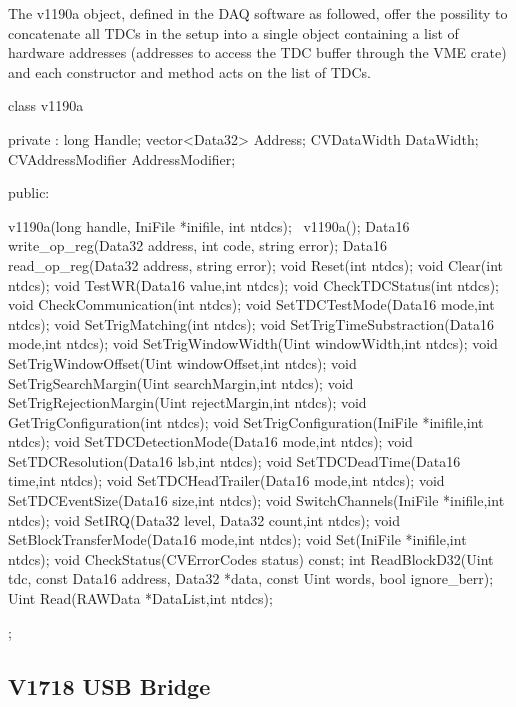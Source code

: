 	The v1190a object, defined in the DAQ software as followed, offer the possility to concatenate all TDCs in the setup into a single object containing a list of hardware addresses (addresses to access the TDC buffer through the VME crate) and each constructor and method acts on the list of TDCs.
	
    \begin{cppcode}
class v1190a
{
 private :
    long              Handle;
    vector<Data32>    Address;
    CVDataWidth       DataWidth;
    CVAddressModifier AddressModifier;

 public:

    v1190a(long handle, IniFile *inifile, int ntdcs);
    ~v1190a();
    Data16 write_op_reg(Data32 address, int code, string error);
    Data16 read_op_reg(Data32 address, string error);
    void   Reset(int ntdcs);
    void   Clear(int ntdcs);
    void   TestWR(Data16 value,int ntdcs);
    void   CheckTDCStatus(int ntdcs);
    void   CheckCommunication(int ntdcs);
    void   SetTDCTestMode(Data16 mode,int ntdcs);
    void   SetTrigMatching(int ntdcs);
    void   SetTrigTimeSubstraction(Data16 mode,int ntdcs);
    void   SetTrigWindowWidth(Uint windowWidth,int ntdcs);
    void   SetTrigWindowOffset(Uint windowOffset,int ntdcs);
    void   SetTrigSearchMargin(Uint searchMargin,int ntdcs);
    void   SetTrigRejectionMargin(Uint rejectMargin,int ntdcs);
    void   GetTrigConfiguration(int ntdcs);
    void   SetTrigConfiguration(IniFile *inifile,int ntdcs);
    void   SetTDCDetectionMode(Data16 mode,int ntdcs);
    void   SetTDCResolution(Data16 lsb,int ntdcs);
    void   SetTDCDeadTime(Data16 time,int ntdcs);
    void   SetTDCHeadTrailer(Data16 mode,int ntdcs);
    void   SetTDCEventSize(Data16 size,int ntdcs);
    void   SwitchChannels(IniFile *inifile,int ntdcs);
    void   SetIRQ(Data32 level, Data32 count,int ntdcs);
    void   SetBlockTransferMode(Data16 mode,int ntdcs);
    void   Set(IniFile *inifile,int ntdcs);
    void   CheckStatus(CVErrorCodes status) const;
    int    ReadBlockD32(Uint tdc, const Data16 address,
               Data32 *data, const Uint words, bool ignore_berr);
    Uint   Read(RAWData *DataList,int ntdcs);
};
    \end{cppcode}

    \subsection{V1718 USB Bridge}
    \label{app1:ssec:V1718}
	
